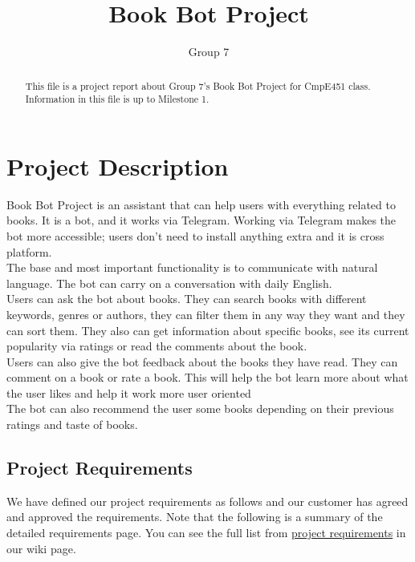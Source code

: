 \documentclass[a4paper]{article}
\title{Book Bot Project}
\author{Group 7}
\begin{document}
\maketitle

\begin{abstract}
This file is a project report about Group 7's Book Bot Project for CmpE451 class. Information in this file is up to Milestone 1.
\end{abstract}

\section{Project Description}

 \qquad Book Bot Project is an assistant that can help users with everything related to books. It is a bot, and it works via Telegram. Working via Telegram makes the bot more accessible; users don't need to install anything extra and it is cross platform. \\
  
  
  \quad The base and most important functionality is to communicate with natural language. The bot can carry on a conversation with daily English. \\
 
  
  \quad Users can ask the bot about books. They can search books with different keywords, genres or authors, they can filter them in any way they want and they can sort them. They also can get information about specific books, see its current popularity via ratings or read the comments about the book.\\
 
  
  \quad Users can also give the bot feedback about the books they have read. They can comment on a book or rate a book. This will help the bot learn more about what the user likes and help it work more user oriented \\
 
  
  \quad The bot can also recommend the user some books depending on their previous ratings and taste of books.

\subsection{Project Requirements}

We have defined our project requirements as follows and our customer has agreed and approved the requirements. Note that the following is a summary of the detailed requirements page. You can see the full list from \href{https://github.com/bounswe/bounswe2017group7/wiki/Project-Requirements}{project requirements} in our wiki page.
\end{document}
